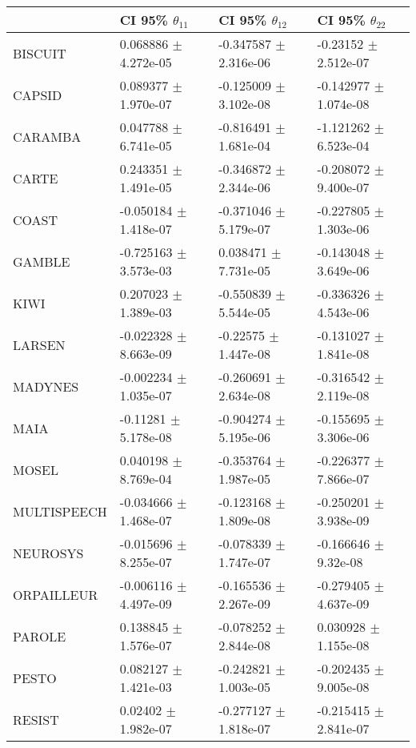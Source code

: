 \begin{tabular}{llll}
\toprule
{} &      CI 95\% $\theta_{11}$ &      CI 95\% $\theta_{12}$ &      CI 95\% $\theta_{22}$ \\
\midrule
BISCUIT     &   0.068886 $\pm$ 4.272e-05 &  -0.347587 $\pm$ 2.316e-06 &   -0.23152 $\pm$ 2.512e-07 \\
CAPSID      &   0.089377 $\pm$ 1.970e-07 &  -0.125009 $\pm$ 3.102e-08 &  -0.142977 $\pm$ 1.074e-08 \\
CARAMBA     &   0.047788 $\pm$ 6.741e-05 &  -0.816491 $\pm$ 1.681e-04 &  -1.121262 $\pm$ 6.523e-04 \\
CARTE       &   0.243351 $\pm$ 1.491e-05 &  -0.346872 $\pm$ 2.344e-06 &  -0.208072 $\pm$ 9.400e-07 \\
COAST       &  -0.050184 $\pm$ 1.418e-07 &  -0.371046 $\pm$ 5.179e-07 &  -0.227805 $\pm$ 1.303e-06 \\
GAMBLE      &  -0.725163 $\pm$ 3.573e-03 &   0.038471 $\pm$ 7.731e-05 &  -0.143048 $\pm$ 3.649e-06 \\
KIWI        &   0.207023 $\pm$ 1.389e-03 &  -0.550839 $\pm$ 5.544e-05 &  -0.336326 $\pm$ 4.543e-06 \\
LARSEN      &  -0.022328 $\pm$ 8.663e-09 &   -0.22575 $\pm$ 1.447e-08 &  -0.131027 $\pm$ 1.841e-08 \\
MADYNES     &  -0.002234 $\pm$ 1.035e-07 &  -0.260691 $\pm$ 2.634e-08 &  -0.316542 $\pm$ 2.119e-08 \\
MAIA        &   -0.11281 $\pm$ 5.178e-08 &  -0.904274 $\pm$ 5.195e-06 &  -0.155695 $\pm$ 3.306e-06 \\
MOSEL       &   0.040198 $\pm$ 8.769e-04 &  -0.353764 $\pm$ 1.987e-05 &  -0.226377 $\pm$ 7.866e-07 \\
MULTISPEECH &  -0.034666 $\pm$ 1.468e-07 &  -0.123168 $\pm$ 1.809e-08 &  -0.250201 $\pm$ 3.938e-09 \\
NEUROSYS    &  -0.015696 $\pm$ 8.255e-07 &  -0.078339 $\pm$ 1.747e-07 &   -0.166646 $\pm$ 9.32e-08 \\
ORPAILLEUR  &  -0.006116 $\pm$ 4.497e-09 &  -0.165536 $\pm$ 2.267e-09 &  -0.279405 $\pm$ 4.637e-09 \\
PAROLE      &   0.138845 $\pm$ 1.576e-07 &  -0.078252 $\pm$ 2.844e-08 &   0.030928 $\pm$ 1.155e-08 \\
PESTO       &   0.082127 $\pm$ 1.421e-03 &  -0.242821 $\pm$ 1.003e-05 &  -0.202435 $\pm$ 9.005e-08 \\
RESIST      &    0.02402 $\pm$ 1.982e-07 &  -0.277127 $\pm$ 1.818e-07 &  -0.215415 $\pm$ 2.841e-07 \\

\end{tabular}
